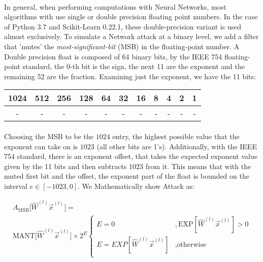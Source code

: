 \documentclass[12pt,letterpaper]{article}
\begin{document}
\paragraph*{}In general, when performing computations with Neural Networks, most algorithms with use single or double precision floating point numbers.  In the case of Python 3.7 and Scikit-Learn 0.22.1, these double-precision variant is used almost exclusively. To simulate a Network attack at a binary level, we add a filter that 'mutes' the \textit{most-significant-bit} (MSB) in the floating-point number. A Double precision float is composed of 64 binary bits, by the IEEE 754 floating-point standard, the 0-th bit is the sign, the next 11 are the exponent and the remaining 52 are the fraction. Examining just the exponent, we have the 11 bits:

\begin{center}
\begin{tabular}{|c|c|c|c|c|c|c|c|c|c|c|}
\hline
1024 & 512 & 256 & 128 & 64 & 32 & 16 & 8 & 4 & 2 & 1 \\ \hline
- & - & - & - & - & - & - & - & - & - & -  \\ \hline
\end{tabular}
\end{center}

\paragraph*{}Choosing the MSB to be the $1024$ entry, the highest possible value that the exponent can take on is $1023$ (all other bits are 1's). Additionally, with the IEEE 754 standard, there is an exponent offset, that takes the expected exponent value given by the 11 bits and then subtracts $1023$ from it. This means that with the muted first bit and the offset, the exponent part of the float is bounded on the interval 
$e \in [-1023,0]$. We Mathematically show Attack as:

\begin{multline}
\label{mute MSB attack}
A_{\text{MSB}} \big[ \hat{W}^{(l)} \vec{x}^{(l)} \big] = \\
\text{MANT} \big[ \hat{W}^{(l)} \vec{x}^{(l)} \big] \times 2^{E}
\left\{
        \begin{array}{ll}
            E = 0 									&, \text{EXP}[\hat{W}^{(l)} \vec{x}^{(l)}] > 0 \\
            E = EXP[\hat{W}^{(l)} \vec{x}^{(l)}] 	&, \text{otherwise} \\
        \end{array}
    \right.
\end{multline}
\end{document}
